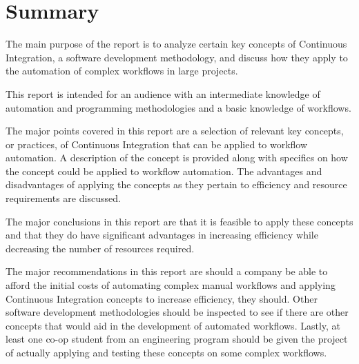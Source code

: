 \section*{Summary} %
\label{sec:summary}

The main purpose of the report is to analyze certain key concepts of Continuous Integration, a software development methodology, and discuss how they apply to the automation of complex workflows in large projects.\newline
 
This report is intended for an audience with an intermediate knowledge of automation and programming methodologies and a basic knowledge of workflows.\newline

The major points covered in this report are a selection of relevant key concepts, or practices, of Continuous Integration that can be applied to workflow automation. A description of the concept is provided along with specifics on how the concept could be applied to workflow automation. The advantages and disadvantages of applying the concepts as they pertain to efficiency and resource requirements are discussed.\newline

The major conclusions in this report are that it is feasible to apply these concepts and that they do have significant advantages in increasing efficiency while decreasing the number of resources required.\newline

The major recommendations in this report are should a company be able to afford the initial costs of automating complex manual workflows and applying Continuous Integration concepts to increase efficiency, they should. Other software development methodologies should be inspected to see if there are other concepts that would aid in the development of automated workflows. Lastly, at least one co-op student from an engineering program should be given the project of actually applying and testing these concepts on some complex workflows.
